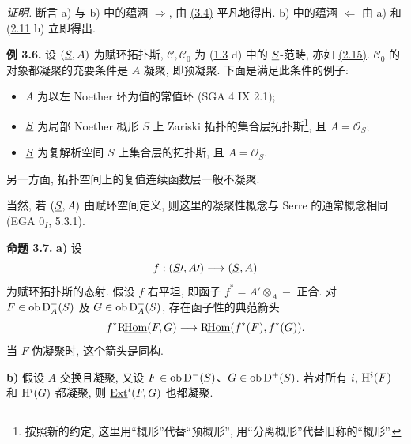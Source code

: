 \emph{证明.} 断言 a) 与 b) 中的蕴涵 \(\Rightarrow\), 由 \hyperlink{sga6.e01.cor.3-4}{(3.4)} 平凡地得出. b) 中的蕴涵 \(\Leftarrow\) 由 a) 和 (\hyperlink{sga6.e01.prop.2-11}{2.11} b) 立即得出.

\textbf{例 3.6.} 设 \((\underline S,A)\) 为赋环拓扑斯, \(\mathcal C,\mathcal C_0\) 为 (\hyperlink{sga6.e01.sec.1.3}{1.3} d) 中的 \(\underline S\)-范畴, 亦如 \hyperlink{sga6.e01.ex.2-15}{(2.15)}. \(\mathcal C_0\) 的对象都凝聚的充要条件是 \(A\) 凝聚, 即预凝聚. 下面是满足此条件的例子:
\begin{itemize}
\item \(A\) 为以左 Noether 环为值的常值环 (SGA 4 IX 2.1);
\item \(\underline S\) 为局部 Noether 概形 \(S\) 上 Zariski 拓扑的集合层拓扑斯\footnote{按照新的约定, 这里用“概形”代替“预概形”, 用“分离概形”代替旧称的“概形”.}, 且 \(A=\mathcal O_S\);
\item \(\underline S\) 为复解析空间 \(S\) 上集合层的拓扑斯, 且 \(A=\mathcal O_S\).
\end{itemize}
另一方面, 拓扑空间上的复值连续函数层一般不凝聚.

当然, 若 \((\underline S,A)\) 由赋环空间定义, 则这里的凝聚性概念与 Serre 的通常概念相同 (EGA \(0_I\), 5.3.1).

\textbf{命题 3.7.} \textbf{a)} 设
\[
  f:(\underline S\prime,A\prime)\longrightarrow(\underline S,A)
\]
为赋环拓扑斯的态射. 假设 \(f\) 右平坦, 即函子 \(f^*=A'\otimes_A-\) 正合. 对 \(F\in\operatorname{ob}\mathrm D_A^-(S)\) 及 \(G\in\operatorname{ob}\mathrm D_A^+(S)\), 存在函子性的典范箭头
\[
  f^*\mathrm R\!\underline{\operatorname{Hom}}(F,G)\longrightarrow \mathrm R\!\underline{\operatorname{Hom}}(f^*(F),f^*(G)).
\]
当 \(F\) 伪凝聚时, 这个箭头是同构.

\textbf{b)} 假设 \(A\) 交换且凝聚, 又设 \(F\in\operatorname{ob}\mathrm D^-(S)\)、\(G\in\operatorname{ob}\mathrm D^+(S)\). 若对所有 \(i\), \(\mathrm H^i(F)\) 和 \(\mathrm H^i(G)\) 都凝聚, 则 \(\underline{\operatorname{Ext}}^i(F,G)\) 也都凝聚.

